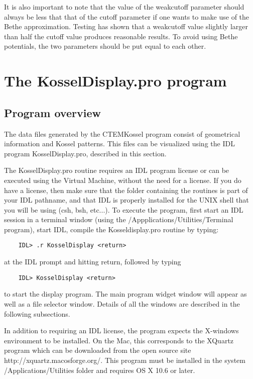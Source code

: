 \documentclass[DIV=calc, paper=letter, fontsize=11pt]{scrartcl}	 %
\begin{document}
It is also important to note that the value of the \textsf{weakcutoff} parameter should always be less that
that of the \textsf{cutoff} parameter if one wants to make use of the Bethe approximation.  Testing has shown
that a \textsf{weakcutoff} value slightly larger than half the \textsf{cutoff} value produces reasonable 
results.  To avoid using Bethe potentials, the two parameters should be put equal to each other.


\section{The \protect\textsf{KosselDisplay.pro} program\label{sec:idl}}

\subsection{Program overview\label{sec:idloverview}}
The data files generated by the \textsf{CTEMKossel} program consist of geometrical information and Kossel patterns.
This files can be visualized using the IDL program \textsf{KosselDisplay.pro}, described in this section.

The \textsf{KosselDisplay.pro} routine requires an IDL program license or can be executed using the Virtual Machine, without the need for a license. 
If you do have a license, then make sure that the folder containing the routines is part of your IDL pathname,
and that IDL is properly installed for the UNIX shell that you will be using (csh, bsh, etc...).
To execute the program, first start an IDL session in a terminal window (using the /Appplications/Utilities/Terminal program), 
start IDL, compile the \textsf{Kosseldisplay.pro} routine by typing:
\begin{verbatim}
	IDL> .r KosselDisplay <return>
\end{verbatim}
at the IDL prompt and hitting return, followed by typing 
\begin{verbatim}
	IDL> KosselDisplay <return>
\end{verbatim}
to start the display program.  The main program widget window will appear as well as a file selector window.  
Details of all the windows are described in the following subsections.

In addition to requiring an IDL license, the program expects the X-windows environment to be installed.  On the Mac, this corresponds
to the \textsf{XQuartz} program which can be downloaded from the open source site \textsf{http://xquartz.macosforge.org/}.  This program
must be installed in the system /Applications/Utilities folder and requires OS X 10.6 or later.
\end{document}
